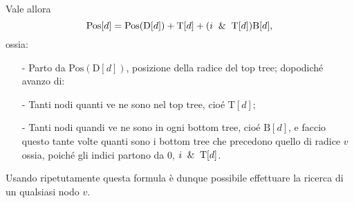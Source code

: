 Vale allora \[\mbox{Pos}[d]=\mbox{Pos}(\mbox{D}[d])+\mbox{T}[d]+(i\And \mbox{T}[d])\mbox{B}[d],\] ossia:
\begin{itemize}
\item[-] Parto da $\mbox{Pos}(\mbox{D}[d])$, posizione della radice del top tree; dopodiché avanzo di:
\item[-] Tanti nodi quanti ve ne sono nel top tree, cioé $\mbox{T}[d]$;
\item[-] Tanti nodi quandi ve ne sono in ogni bottom tree, cioé $\mbox{B}[d]$, e faccio questo tante volte quanti sono i bottom tree che precedono quello di radice $v$ ossia, poiché gli indici partono da 0, $i\And \mbox{T}[d]$.
\end{itemize}
Usando ripetutamente questa formula è dunque possibile effettuare la ricerca di un qualsiasi nodo $v$. 
